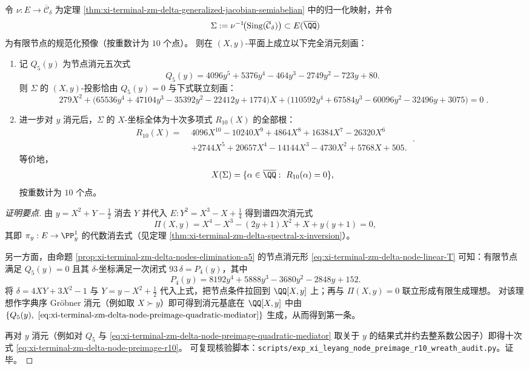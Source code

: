 \begin{theorem}[节点预像的二次中介式与十次消元]\label{thm:xi-terminal-zm-delta-node-preimage-elimination-r10}
令 \(\nu:E\to\overline{\mathcal C}_\delta\) 为定理 \ref{thm:xi-terminal-zm-delta-generalized-jacobian-semiabelian} 中的归一化映射，并令
\[
\Sigma:=\nu^{-1}\!\bigl(\mathrm{Sing}(\overline{\mathcal C}_\delta)\bigr)\subset E(\overline{\QQ})
\]
为有限节点的规范化预像（按重数计为 \(10\) 个点）。
则在 \((X,y)\)-平面上成立以下完全消元刻画：
\begin{enumerate}
  \item 记 \(Q_5(y)\) 为节点消元五次式
  \[
  Q_{5}(y)=4096y^{5}+5376y^{4}-464y^{3}-2749y^{2}-723y+80.
  \]
  则 \(\Sigma\) 的 \((X,y)\)-投影恰由 \(Q_5(y)=0\) 与下式联立刻画：
  \begin{equation}\label{eq:xi-terminal-zm-delta-node-preimage-quadratic-mediator}
  \boxed{\;
  279X^{2}+\bigl(65536y^{4}+47104y^{3}-35392y^{2}-22412y+1774\bigr)X
  +\bigl(110592y^{4}+67584y^{3}-60096y^{2}-32496y+3075\bigr)=0\; } .
  \end{equation}
  \item 进一步对 \(y\) 消元后，\(\Sigma\) 的 \(X\)-坐标全体为十次多项式 \(R_{10}(X)\) 的全部根：
  \begin{equation}\label{eq:xi-terminal-zm-delta-node-preimage-r10}
  \boxed{\;
  \begin{aligned}
  R_{10}(X)=\;&4096X^{10}-10240X^{9}+4864X^{8}+16384X^{7}-26320X^{6}\\
  &+2744X^{5}+20657X^{4}-14144X^{3}-4730X^{2}+5768X+505.
  \end{aligned}\; } .
  \end{equation}
  等价地，
  \[
  X(\Sigma)=\{\alpha\in\overline{\QQ}:\ R_{10}(\alpha)=0\},
  \]
  按重数计为 \(10\) 个点。
\end{enumerate}
\end{theorem}

\begin{proof}[证明要点]
由 \(y=X^{2}+Y-\tfrac12\) 消去 \(Y\) 并代入 \(E:Y^{2}=X^{3}-X+\tfrac14\) 得到谱四次消元式
\[
\Pi(X,y)=X^{4}-X^{3}-(2y+1)X^{2}+X+y(y+1)=0,
\]
其即 \(\pi_y:E\to\PP^1_y\) 的代数消去式（见定理 \ref{thm:xi-terminal-zm-delta-spectral-x-inversion}）。
\par
另一方面，由命题 \ref{prop:xi-terminal-zm-delta-nodes-elimination-a5} 的节点消元形 \eqref{eq:xi-terminal-zm-delta-node-linear-T} 可知：有限节点满足 \(Q_5(y)=0\) 且其 \(\delta\)-坐标满足一次闭式 \(93\,\delta=P_4(y)\)，其中
\[
P_4(y)=8192y^{4}+5888y^{3}-3680y^{2}-2848y+152.
\]
将 \(\delta=4XY+3X^{2}-1\) 与 \(Y=y-X^{2}+\tfrac12\) 代入上式，把节点条件拉回到 \(\QQ[X,y]\) 上；再与 \(\Pi(X,y)=0\) 联立形成有限生成理想。
对该理想作字典序 Gröbner 消元（例如取 \(X\succ y\)）即可得到消元基底在 \(\QQ[X,y]\) 中由 \(\{Q_5(y),\ \eqref{eq:xi-terminal-zm-delta-node-preimage-quadratic-mediator}\}\) 生成，从而得到第一条。
\par
再对 \(y\) 消元（例如对 \(Q_5\) 与 \eqref{eq:xi-terminal-zm-delta-node-preimage-quadratic-mediator} 取关于 \(y\) 的结果式并约去整系数公因子）即得十次式 \eqref{eq:xi-terminal-zm-delta-node-preimage-r10}。
可复现核验脚本：\texttt{scripts/exp\_xi\_leyang\_node\_preimage\_r10\_wreath\_audit.py}。证毕。
\end{proof}

